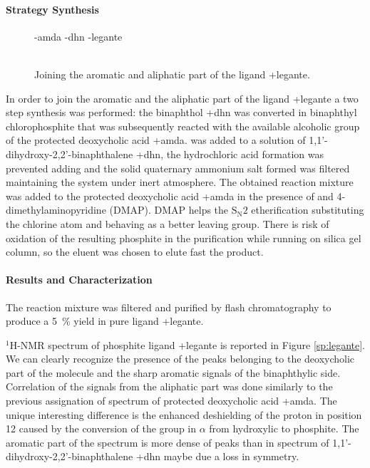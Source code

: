   \paragraph{Strategy Synthesis}
  \begin{figure}
    \cmpdref-{amda}
    \cmpdref-{dhn}
    \cmpdref-{legante}
    \caption{\\ Joining the aromatic and aliphatic part of the ligand \cmpd+{legante}.\label{sc:amda-dhn-legante}}
  \end{figure}
  In order to join the aromatic and the aliphatic part of the ligand \cmpd+{legante} a two step synthesis was performed: the bi\-naphthol \cmpd+{dhn} was converted in bi\-naphthyl chloro\-phosphite that was subsequently reacted with the available alcoholic group of the protected de\-oxy\-cholic acid \cmpd+{amda}. 
   was added to a solution of 1,1'-di\-hydroxy-2,2'-bi\-naphthalene \cmpd+{dhn}, the hydrochloric acid formation was prevented adding  and the solid quaternary ammonium salt formed was filtered maintaining the system under inert atmosphere. The obtained reaction mixture was added to the protected de\-oxy\-cholic acid \cmpd+{amda} in the presence of  and 4-dimethyl\-amino\-pyridine (DMAP). DMAP helps the $\mathrm{S_N}2$ etherification substituting the chlorine atom and behaving as a better leaving group.  
  There is risk of oxidation of the resulting phosphite in the purification while running on silica gel column, so the eluent was chosen to elute fast the product.

  \paragraph{Results and Characterization}
    The reaction mixture was filtered and purified by flash chromatography to produce a 5~\% yield in pure ligand \cmpd+{legante}.
    
    $^{1}$H-NMR spectrum of phosphite ligand \cmpd+{legante} is reported in Figure \ref{sp:legante}. We can clearly recognize the presence of the peaks belonging to the de\-oxy\-cholic part of the molecule and the sharp aromatic signals of the bi\-naphthylic side. Correlation of the signals from the aliphatic part was done similarly to the previous assignation of spectrum of protected de\-oxy\-cholic acid \cmpd+{amda}. The unique interesting difference is the enhanced de\-shielding of the proton in position 12 caused by the conversion of the group in $\alpha$ from hydroxylic to phosphite.
    The aromatic part of the spectrum is more dense of peaks than in spectrum of 1,1'-di\-hydroxy-2,2'-bi\-naphthalene \cmpd+{dhn} maybe due a loss in symmetry. 
    
